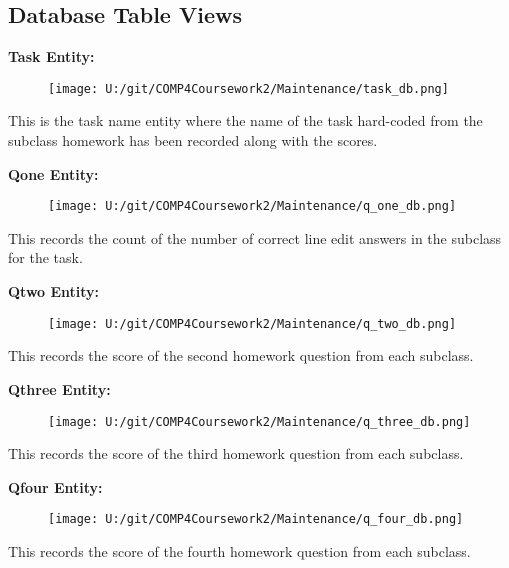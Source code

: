 \subsection{Database Table Views}

\textbf{Task Entity: }

\begin{figure}[H]
    \texttt{[image: U:/git/COMP4Coursework2/Maintenance/task\_db.png]}
    \label{fig:print_function_result}
\end{figure}

This is the task name entity where the name of the task hard-coded from the subclass homework has been recorded along with the scores.

\textbf{Qone Entity: }

\begin{figure}[H]
    \texttt{[image: U:/git/COMP4Coursework2/Maintenance/q\_one\_db.png]}
    \label{fig:print_function_result}
\end{figure}

This records the count of the number of correct line edit answers in the subclass for the task.

\textbf{Qtwo Entity: }

\begin{figure}[H]
    \texttt{[image: U:/git/COMP4Coursework2/Maintenance/q\_two\_db.png]}
    \label{fig:print_function_result}
\end{figure}

This records the score of the second homework question from each subclass.

\textbf{Qthree Entity: }

\begin{figure}[H]
    \texttt{[image: U:/git/COMP4Coursework2/Maintenance/q\_three\_db.png]}
    \label{fig:print_function_result}
\end{figure}

This records the score of the third homework question from each subclass.

\textbf{Qfour Entity: }

\begin{figure}[H]
    \texttt{[image: U:/git/COMP4Coursework2/Maintenance/q\_four\_db.png]}
    \label{fig:print_function_result}
\end{figure}

This records the score of the fourth homework question from each subclass.

